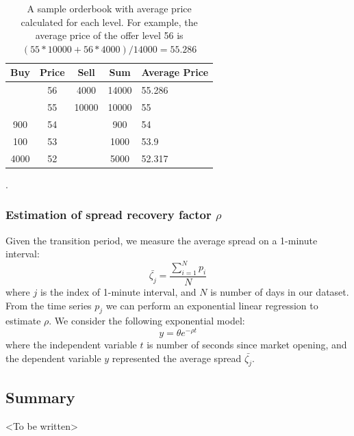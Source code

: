 \documentclass{article}
\begin{document}
\begin{table}[h]
  \centering
  \begin{tabular}{|c|c|c|c|l|}
    \hline
    \textbf{Buy} & \textbf{Price} & \textbf{Sell} & \textbf{Sum} & \multicolumn{1}{c|}{\textbf{Average Price}} \\ \hline
                 & 56             & 4000          & 14000        & 55.286                                      \\ \hline
                 & 55             & 10000         & 10000        & 55                                          \\ \hline
    900          & 54             &               & 900          & 54                                          \\ \hline
    100          & 53             &               & 1000         & 53.9                                        \\ \hline
    4000         & 52             &               & 5000         & 52.317                                      \\ \hline
  \end{tabular}
  \caption{A sample orderbook with average price calculated for each level. For example, the average price of the offer level 56 is $(55*10000+56*4000)/14000 = 55.286$}.
  \label{tbl:bookAvgPxConversion}
\end{table}

\subsubsection{Estimation of spread recovery factor $\rho$}

Given the transition period, we measure the average spread on a 1-minute interval:
\[
  \bar{\zeta_j} = \frac{\sum_{i=1}^N p_i}{N}
\]
where $j$ is the index of 1-minute interval, and $N$ is number of days in our dataset. From the time series $p_j$ we can perform an exponential linear regression to estimate $\rho$. We consider the following exponential model:
\[
  y = \theta e^{-\rho t}
\]
where the independent variable $t$ is number of seconds since market opening, and the dependent variable $y$ represented the average spread $\bar{\zeta_j}$.

\subsection{Summary}

<To be written>
\end{document}
